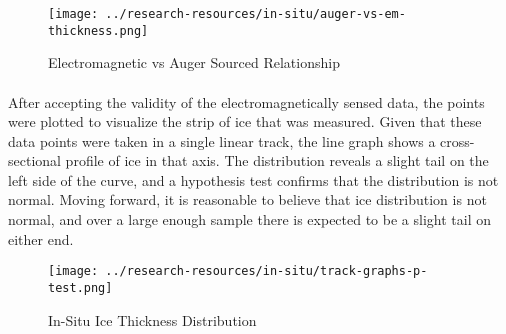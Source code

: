 \begin{figure}[htb]
	\centering
	\texttt{[image: ../research-resources/in-situ/auger-vs-em-thickness.png]}
	\caption{Electromagnetic vs Auger Sourced Relationship}
	\label{fig:aug-vs-em}
\end{figure}

\paragraph*{}
After accepting the validity of the electromagnetically sensed data, the points were plotted to visualize the strip of ice that was measured. Given that these data points were taken in a single linear track, the line graph shows a cross-sectional profile of ice in that axis. The distribution reveals a slight tail on the left side of the curve, and a hypothesis test confirms that the distribution is not normal. Moving forward, it is reasonable to believe that ice distribution is not normal, and over a large enough sample there is expected to be a slight tail on either end.
\par
\begin{figure}[htb]
	\centering
	\texttt{[image: ../research-resources/in-situ/track-graphs-p-test.png]}
	\caption{In-Situ Ice Thickness Distribution}
	\label{fig:p-test-aug}
\end{figure}

